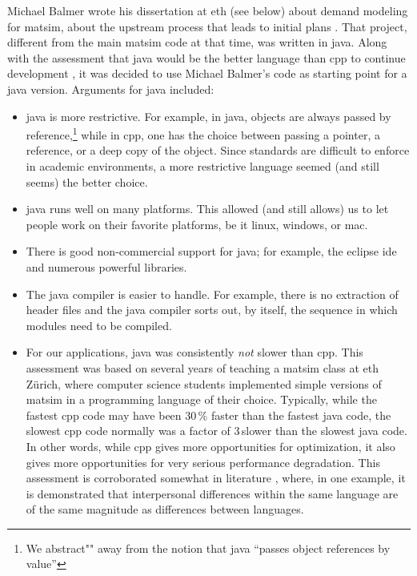 Michael Balmer wrote his dissertation at \gls{eth} (see below) about demand modeling for \gls{matsim}, \ie about the upstream process that leads to initial plans
\citep{Balmer_PhDThesis_2007}.  That project, different from the main \gls{matsim} code at that time, was written in \gls{java}.  Along with the assessment that \gls{java} would be the better language than \gls{cpp} to continue development%
, it was decided to use Michael Balmer's code as starting point for a \gls{java} version.  Arguments for \gls{java} included:
%
\begin{itemize}\styleItemize
\item  \gls{java} is more restrictive. For example, in \gls{java}, objects are always passed by reference,\footnote{%
%
We abstract"" away from the notion that \gls{java} ``passes object references by value'' %
%
} while in \gls{cpp}, one has the choice between passing a pointer, a reference, or a deep copy of the object.  Since standards are difficult to enforce in academic environments, a more restrictive language seemed (and still seems) the better choice.

\item \gls{java} runs well on many platforms.  This allowed (and still allows) us to let people work on their favorite platforms, be it \gls{linux}, \gls{windows}, or \gls{mac}.

\item There is good non-commercial support for \gls{java}; for example, the \gls{eclipse} \gls{ide} and numerous powerful libraries.

\item The \gls{java} compiler is easier to handle.  For example, there is no extraction of header files and the \gls{java} compiler sorts out, by itself, the sequence in which modules need to be compiled.

\item For our applications, \gls{java} was consistently \emph{not} slower than \gls{cpp}.  This assessment was based on several years of teaching a \gls{matsim} class at \gls{eth} Zürich, where computer science students implemented simple versions of \gls{matsim} in a programming language of their choice.  Typically, while the fastest \gls{cpp} code may have been 30\,\% faster than the fastest \gls{java} code, the slowest \gls{cpp} code normally was a factor of 3\,slower than the slowest \gls{java} code.  In other words, while \gls{cpp} gives more opportunities for optimization, it also gives more opportunities for very serious performance degradation.  This assessment is corroborated somewhat in literature \citep{Prechelt1999EfficiencyJavaVsCpp}, where, in one example, it is demonstrated that interpersonal differences within the same language are of the same magnitude as  differences between languages.


\end{itemize}
